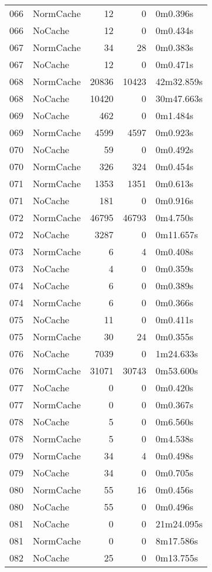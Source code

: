 \begin{tabular}{llrrl}
066 & NormCache & 12 & 0 & 0m0.396s \\
066 & NoCache & 12 & 0 & 0m0.434s \\
067 & NormCache & 34 & 28 & 0m0.383s \\
067 & NoCache & 12 & 0 & 0m0.471s \\
068 & NormCache & 20836 & 10423 & 42m32.859s \\
068 & NoCache & 10420 & 0 & 30m47.663s \\
069 & NoCache & 462 & 0 & 0m1.484s \\
069 & NormCache & 4599 & 4597 & 0m0.923s \\
070 & NoCache & 59 & 0 & 0m0.492s \\
070 & NormCache & 326 & 324 & 0m0.454s \\
071 & NormCache & 1353 & 1351 & 0m0.613s \\
071 & NoCache & 181 & 0 & 0m0.916s \\
072 & NormCache & 46795 & 46793 & 0m4.750s \\
072 & NoCache & 3287 & 0 & 0m11.657s \\
073 & NormCache & 6 & 4 & 0m0.408s \\
073 & NoCache & 4 & 0 & 0m0.359s \\
074 & NoCache & 6 & 0 & 0m0.389s \\
074 & NormCache & 6 & 0 & 0m0.366s \\
075 & NoCache & 11 & 0 & 0m0.411s \\
075 & NormCache & 30 & 24 & 0m0.355s \\
076 & NoCache & 7039 & 0 & 1m24.633s \\
076 & NormCache & 31071 & 30743 & 0m53.600s \\
077 & NoCache & 0 & 0 & 0m0.420s \\
077 & NormCache & 0 & 0 & 0m0.367s \\
078 & NoCache & 5 & 0 & 0m6.560s \\
078 & NormCache & 5 & 0 & 0m4.538s \\
079 & NormCache & 34 & 4 & 0m0.498s \\
079 & NoCache & 34 & 0 & 0m0.705s \\
080 & NormCache & 55 & 16 & 0m0.456s \\
080 & NoCache & 55 & 0 & 0m0.496s \\
081 & NoCache & 0 & 0 & 21m24.095s \\
081 & NormCache & 0 & 0 & 8m17.586s \\
082 & NoCache & 25 & 0 & 0m13.755s \\

\end{tabular}
